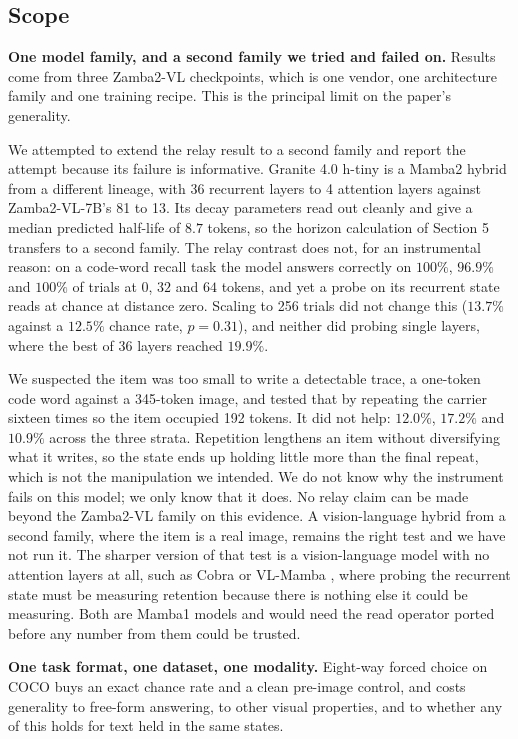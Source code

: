 \documentclass{article}
\begin{document}
\subsection{Scope}

\textbf{One model family, and a second family we tried and failed on.} Results
come from three Zamba2-VL checkpoints, which is one vendor, one architecture
family and one training recipe. This is the principal limit on the paper's
generality.

We attempted to extend the relay result to a second family and report the
attempt because its failure is informative. Granite 4.0 h-tiny \cite{granite4} is a Mamba2
hybrid from a different lineage, with 36 recurrent layers to 4 attention layers
against Zamba2-VL-7B's 81 to 13. Its decay parameters read out cleanly and give
a median predicted half-life of $8.7$ tokens, so the horizon calculation of
Section 5 transfers to a second family. The relay contrast does not, for an
instrumental reason: on a code-word recall task the model answers correctly on
$100\%$, $96.9\%$ and $100\%$ of trials at $0$, $32$ and $64$ tokens, and yet a
probe on its recurrent state reads at chance at distance zero. Scaling to 256
trials did not change this ($13.7\%$ against a $12.5\%$ chance rate,
$p = 0.31$), and neither did probing single layers, where the best of 36 layers
reached $19.9\%$.

We suspected the item was too small to write a detectable trace, a one-token
code word against a 345-token image, and tested that by repeating the carrier
sixteen times so the item occupied 192 tokens. It did not help: $12.0\%$,
$17.2\%$ and $10.9\%$ across the three strata. Repetition lengthens an item
without diversifying what it writes, so the state ends up holding little more
than the final repeat, which is not the manipulation we intended. We do not
know why the instrument fails on this model; we only know that it does. No
relay claim can be made beyond the Zamba2-VL family on this evidence. A vision-language hybrid from a second family, where the item
is a real image, remains the right test and we have not run it. The sharper
version of that test is a vision-language model with no attention layers at all,
such as Cobra \cite{zhao2025cobra} or VL-Mamba \cite{qiao2024vlmamba}, where
probing the recurrent state must be measuring retention because there is nothing
else it could be measuring. Both are Mamba1 models and would need the read
operator ported before any number from them could be trusted.

\textbf{One task format, one dataset, one modality.} Eight-way forced choice on
COCO buys an exact chance rate and a clean pre-image control, and costs
generality to free-form answering, to other visual properties, and to whether
any of this holds for text held in the same states.
\end{document}
